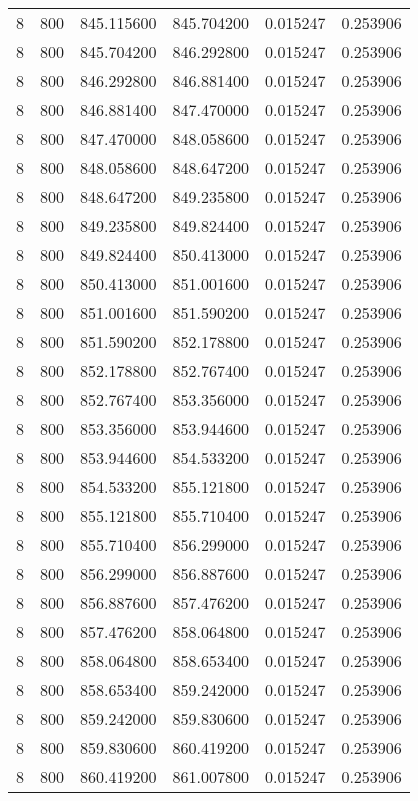 \begin{longtable}{rrrrrr}
8 & 800 & 845.115600 & 845.704200 & 0.015247 & 0.253906 \\
8 & 800 & 845.704200 & 846.292800 & 0.015247 & 0.253906 \\
8 & 800 & 846.292800 & 846.881400 & 0.015247 & 0.253906 \\
8 & 800 & 846.881400 & 847.470000 & 0.015247 & 0.253906 \\
8 & 800 & 847.470000 & 848.058600 & 0.015247 & 0.253906 \\
8 & 800 & 848.058600 & 848.647200 & 0.015247 & 0.253906 \\
8 & 800 & 848.647200 & 849.235800 & 0.015247 & 0.253906 \\
8 & 800 & 849.235800 & 849.824400 & 0.015247 & 0.253906 \\
8 & 800 & 849.824400 & 850.413000 & 0.015247 & 0.253906 \\
8 & 800 & 850.413000 & 851.001600 & 0.015247 & 0.253906 \\
8 & 800 & 851.001600 & 851.590200 & 0.015247 & 0.253906 \\
8 & 800 & 851.590200 & 852.178800 & 0.015247 & 0.253906 \\
8 & 800 & 852.178800 & 852.767400 & 0.015247 & 0.253906 \\
8 & 800 & 852.767400 & 853.356000 & 0.015247 & 0.253906 \\
8 & 800 & 853.356000 & 853.944600 & 0.015247 & 0.253906 \\
8 & 800 & 853.944600 & 854.533200 & 0.015247 & 0.253906 \\
8 & 800 & 854.533200 & 855.121800 & 0.015247 & 0.253906 \\
8 & 800 & 855.121800 & 855.710400 & 0.015247 & 0.253906 \\
8 & 800 & 855.710400 & 856.299000 & 0.015247 & 0.253906 \\
8 & 800 & 856.299000 & 856.887600 & 0.015247 & 0.253906 \\
8 & 800 & 856.887600 & 857.476200 & 0.015247 & 0.253906 \\
8 & 800 & 857.476200 & 858.064800 & 0.015247 & 0.253906 \\
8 & 800 & 858.064800 & 858.653400 & 0.015247 & 0.253906 \\
8 & 800 & 858.653400 & 859.242000 & 0.015247 & 0.253906 \\
8 & 800 & 859.242000 & 859.830600 & 0.015247 & 0.253906 \\
8 & 800 & 859.830600 & 860.419200 & 0.015247 & 0.253906 \\
8 & 800 & 860.419200 & 861.007800 & 0.015247 & 0.253906 \\

\end{longtable}
